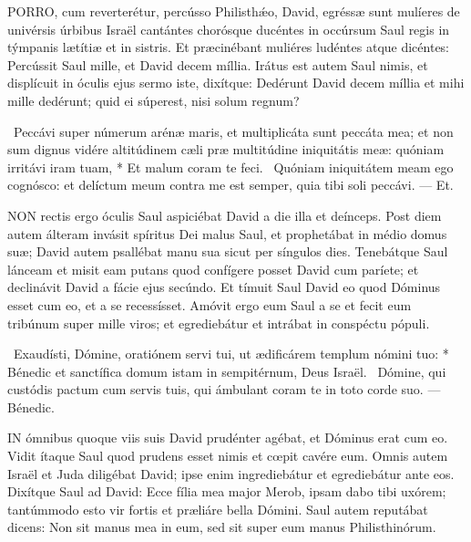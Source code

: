 


\lettrine[lines=2]{P}{ORRO}, cum reverterétur, percússo Philisthǽo, David, egréssæ sunt mulíeres de univérsis úrbibus Israël cantántes chorósque ducéntes in occúrsum Saul regis in týmpanis lætítiæ et in sistris. Et præcinébant muliéres ludéntes atque dicéntes: Percússit Saul mille, et David decem míllia. Irátus est autem Saul nimis, et displícuit in óculis ejus sermo iste, dixítque: Dedérunt David decem míllia et mihi mille dedérunt; quid ei súperest, nisi solum regnum?

\R\ Peccávi super númerum arénæ maris, et multiplicáta sunt peccáta mea; et non sum dignus vidére altitúdinem cæli præ multitúdine iniquitátis meæ: quóniam irritávi iram tuam, * Et malum coram te feci. \V\ Quóniam iniquitátem meam ego cognósco: et delíctum meum contra me est semper, quia tibi soli peccávi. --- Et.


\lettrine[lines=2]{N}{ON} rectis ergo óculis Saul aspiciébat David a die illa et deínceps. Post diem autem álteram invásit spíritus Dei malus Saul, et prophetábat in médio domus suæ; David autem psallébat manu sua sicut per síngulos dies. Tenebátque Saul lánceam et misit eam putans quod confígere posset David cum paríete; et declinávit David a fácie ejus secúndo. Et tímuit Saul David eo quod Dóminus esset cum eo, et a se recessísset. Amóvit ergo eum Saul a se et fecit eum tribúnum super mille viros; et egrediebátur et intrábat in conspéctu pópuli.

\R\ Exaudísti, Dómine, oratiónem servi tui, ut ædificárem templum nómini tuo: * Bénedic et sanctífica domum istam in sempitérnum, Deus Israël. \V\ Dómine, qui custódis pactum cum servis tuis, qui ámbulant coram te in toto corde suo. --- Bénedic.



\lettrine[lines=2]{I}{N} ómnibus quoque viis suis David prudénter agébat, et Dóminus erat cum eo. Vidit ítaque Saul quod prudens esset nimis et cœpit cavére eum. Omnis autem Israël et Juda diligébat David; ipse enim ingrediebátur et egrediebátur ante eos. Dixítque Saul ad David: Ecce fília mea major Merob, ipsam dabo tibi uxórem; tantúmmodo esto vir fortis et præliáre bella Dómini. Saul autem reputábat dicens: Non sit manus mea in eum, sed sit super eum manus Philisthinórum.

